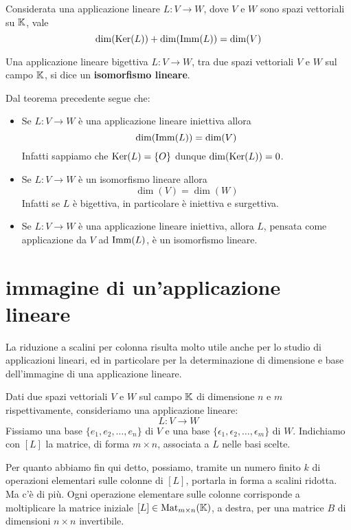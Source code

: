 \begin{theorem}
	Considerata una applicazione lineare $L : V \to W$, dove $V$ e $W$ sono spazi
	vettoriali su $\mathbb{K}$, vale
	\[
		\dim(\operatorname{Ker}(L)) + \dim(\operatorname{Imm}(L)) = \dim(V)
	\]
\end{theorem}

\begin{definition}
	Una applicazione lineare bigettiva $L : V \to W$, tra due spazi vettoriali $V$ e $W$
	sul campo $\mathbb{K}$, si dice un \textbf{isomorfismo lineare}.

	Dal teorema precedente segue che:
	\begin{itemize}
		\item Se $L : V \to W$ è una applicazione lineare iniettiva allora
		      \[ \dim(\operatorname{Imm}(L)) = \dim(V) \]
		      Infatti sappiamo che $\operatorname{Ker}(L) = \{O\}$ dunque $\dim(\operatorname{Ker}(L)) = 0$.
		\item Se $L : V \to W$ è un isomorfismo lineare allora \[\dim(V) = \dim(W)\]
		      Infatti se $L$ è bigettiva, in particolare è iniettiva e surgettiva.
		\item Se $L : V \to W$ è una applicazione lineare iniettiva, allora $L$,
		      pensata come applicazione da $V$ ad $\operatorname{Imm}(L)$, è un isomorfismo lineare.
	\end{itemize}
\end{definition}

\section{immagine di un'applicazione lineare}
La riduzione a scalini per colonna risulta molto utile anche per lo
studio di applicazioni lineari, ed in particolare per la
determinazione di dimensione e base dell'immagine di una applicazione
lineare.

Dati due spazi vettoriali $V$ e $W$ sul campo $\mathbb{K}$ di dimensione $n$
e $m$ rispettivamente, consideriamo una applicazione lineare:
\[
	L : V \to W
\]
Fissiamo una base $\{e_1, e_2, \dots, e_n\}$ di $V$ e una base
$\{\epsilon_1, \epsilon_2, \dots, \epsilon_m\}$ di $W$. Indichiamo con $[L]$
la matrice, di forma $m \times n$, associata a $L$ nelle basi scelte.

Per quanto abbiamo fin qui detto, possiamo, tramite un numero finito $k$ di
operazioni elementari sulle colonne di $[L]$, portarla in forma a scalini
ridotta. Ma c'è di più. Ogni operazione elementare sulle colonne corrisponde
a moltiplicare la matrice iniziale $[L] \in \operatorname{Mat}_{m \times n}(\mathbb{K})$,
a destra, per una matrice $B$ di dimensioni $n \times n$ invertibile.

